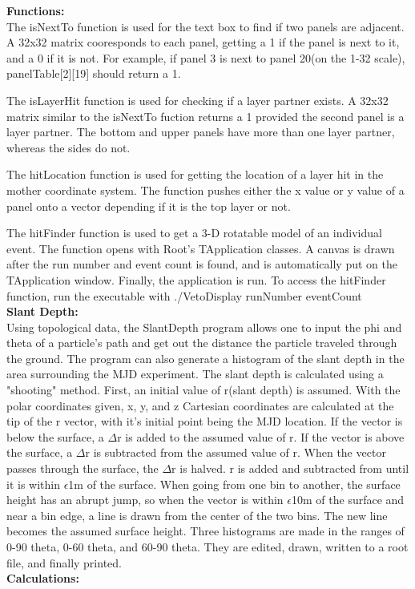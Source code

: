 \documentclass[a4paper,12pt]{article}
\begin{document}
\textbf{Functions:} \\
	The isNextTo function is used for the text box to find if two panels are adjacent. A 32x32 matrix cooresponds to each panel, getting a 1 if the panel is next to it, and a 0 if it is not. For example, if panel 3 is next to panel 20(on the 1-32 scale), panelTable[2][19] should return a 1. 

The isLayerHit function is used for checking if a layer partner exists. A 32x32 matrix similar to the isNextTo fuction returns a 1 provided the second panel is a layer partner. The bottom and upper panels have more than one layer partner, whereas the sides do not.

The hitLocation function is used for getting the location of a layer hit in the mother coordinate system. The function pushes either the x value or y value of a panel onto a vector depending if it is the top layer or not.

The hitFinder function is used to get a 3-D rotatable model of an individual event. The function opens with Root's TApplication classes. A canvas is drawn after the run number and event count is found, and is automatically put on the TApplication window. Finally, the application is run. To access the hitFinder function, run the executable with ./VetoDisplay runNumber eventCount \\

\textbf{Slant Depth:} \\
Using topological data, the SlantDepth program allows one to input the phi and theta of a particle's path and get out the distance the particle traveled through the ground. The program can also generate a histogram of the slant depth in the area surrounding the MJD experiment. The slant depth is calculated using a "shooting" method. First, an initial value of r(slant depth) is assumed. With the polar coordinates given, x, y, and z Cartesian coordinates are calculated at the tip of the r vector, with it's initial point being the MJD location. If the vector is below the surface, a $\Delta$r is added to the assumed value of r. If the vector is above the surface, a $\Delta$r is subtracted from the assumed value of r. When the vector passes through the surface, the $\Delta$r is halved. r is added and subtracted from until it is within $\epsilon$1m of the surface. When going from one bin to another, the surface height has an abrupt jump, so when the vector is within $\epsilon$10m of the surface and near a bin edge, a line is drawn from the center of the two bins. The new line becomes the assumed surface height. Three histograms are made in the ranges of 0-90 theta, 0-60 theta, and 60-90 theta. They are edited, drawn, written to a root file, and finally printed. \\
\textbf{Calculations:} \\
\end{document}
